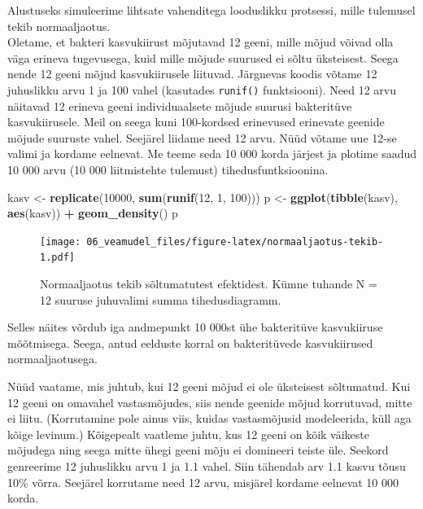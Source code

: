 \documentclass[]{book}
\newenvironment{Shaded}{\begin{snugshade}}{\end{snugshade}}
\newcommand{\KeywordTok}[1]{\textcolor[rgb]{0.13,0.29,0.53}{\textbf{#1}}}
\newcommand{\DecValTok}[1]{\textcolor[rgb]{0.00,0.00,0.81}{#1}}
\newcommand{\StringTok}[1]{\textcolor[rgb]{0.31,0.60,0.02}{#1}}
\newcommand{\OperatorTok}[1]{\textcolor[rgb]{0.81,0.36,0.00}{\textbf{#1}}}
\newcommand{\NormalTok}[1]{#1}
\begin{document}
Alustuseks simuleerime lihtsate vahenditega looduslikku protsessi, mille
tulemusel tekib normaaljaotus.\\
Oletame, et bakteri kasvukiirust mõjutavad 12 geeni, mille mõjud võivad
olla väga erineva tugevusega, kuid mille mõjude suurused ei sõltu
üksteisest. Seega nende 12 geeni mõjud kasvukiirusele liituvad.
Järgnevas koodis võtame 12 juhuslikku arvu 1 ja 100 vahel (kasutades
\texttt{runif()} funktsiooni). Need 12 arvu näitavad 12 erineva geeni
individuaalsete mõjude suurusi bakteritüve kasvukiirusele. Meil on seega
kuni 100-kordsed erinevused erinevate geenide mõjude suuruste vahel.
Seejärel liidame need 12 arvu. Nüüd võtame uue 12-se valimi ja kordame
eelnevat. Me teeme seda 10 000 korda järjest ja plotime saadud 10 000
arvu (10 000 liitmistehte tulemust) tihedusfuntksioonina.




\begin{Shaded}
\begin{Highlighting}[]
\NormalTok{kasv <-}\StringTok{ }\KeywordTok{replicate}\NormalTok{(}\DecValTok{10000}\NormalTok{, }\KeywordTok{sum}\NormalTok{(}\KeywordTok{runif}\NormalTok{(}\DecValTok{12}\NormalTok{, }\DecValTok{1}\NormalTok{, }\DecValTok{100}\NormalTok{))) }
\NormalTok{p <-}\StringTok{ }\KeywordTok{ggplot}\NormalTok{(}\KeywordTok{tibble}\NormalTok{(kasv), }\KeywordTok{aes}\NormalTok{(kasv)) }\OperatorTok{+}\StringTok{ }\KeywordTok{geom_density}\NormalTok{()}
\NormalTok{p}
\end{Highlighting}
\end{Shaded}

\begin{figure}
\centering
\texttt{[image: 06\_veamudel\_files/figure-latex/normaaljaotus-tekib-1.pdf]}
\caption{\label{fig:normaaljaotus-tekib}Normaaljaotus tekib sõltumatutest efektidest.
Kümne tuhande N = 12 suuruse juhuvalimi summa tihedusdiagramm.}
\end{figure}

Selles näites võrdub iga andmepunkt 10 000st ühe bakteritüve
kasvukiiruse mõõtmisega. Seega, antud eelduste korral on bakteritüvede
kasvukiirused normaaljaotusega.

Nüüd vaatame, mis juhtub, kui 12 geeni mõjud ei ole üksteisest
sõltumatud. Kui 12 geeni on omavahel vastasmõjudes, siis nende geenide
mõjud korrutuvad, mitte ei liitu. (Korrutamine pole ainus viis, kuidas
vastasmõjusid modeleerida, küll aga kõige levinum.) Kõigepealt vaatleme
juhtu, kus 12 geeni on kõik väikeste mõjudega ning seega mitte ühegi
geeni mõju ei domineeri teiste üle. Seekord genreerime 12 juhuslikku
arvu 1 ja 1.1 vahel. Siin tähendab arv 1.1 kasvu tõusu 10\% võrra.
Seejärel korrutame need 12 arvu, misjärel kordame eelnevat 10 000 korda.
\end{document}
